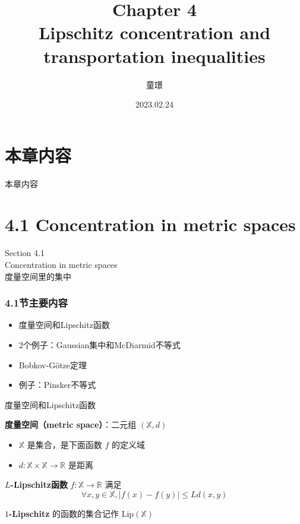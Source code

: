 \documentclass{beamer}
\title{Chapter 4 \\ Lipschitz concentration and transportation inequalities}
\author{童璟}
\date{2023.02.24}
\begin{document}
\frame{\titlepage}

\section{本章内容}

\begin{frame}{本章内容}
\tableofcontents
\end{frame}

\section{4.1 Concentration in metric spaces}

\begin{frame}
\begin{center}
\Large Section 4.1 \\ Concentration in metric spaces \\ 度量空间里的集中
\end{center}
\end{frame}

\begin{frame}
\frametitle{4.1节主要内容}
\begin{itemize}
    \item 度量空间和Lipschitz函数
    \item 2个例子：Gaussian集中和McDiarmid不等式
    \item Bobkov-G{\" o}tze定理
    \item 例子：Pinsker不等式
\end{itemize}
\end{frame}

\begin{frame}{度量空间和Lipschitz函数}

\textbf{度量空间（metric space）}：二元组 $(\mathbb{X}, d)$
\begin{itemize}
    \item $\mathbb{X}$ 是集合，是下面函数 $f$ 的定义域
    \item $d: \mathbb{X}\times \mathbb{X} \to \mathbb{R}$ 是距离
\end{itemize}

\quad

\textbf{$L$-Lipschitz函数} $f: \mathbb{X} \to \mathbb{R}$ 满足
$$
\forall x, y \in\mathbb{X}, |f(x) - f(y)| \le L d(x, y)
$$

\textbf{$1$-Lipschitz} 的函数的集合记作 $\text{Lip}(\mathbb{X})$

\end{frame}
\end{document}
